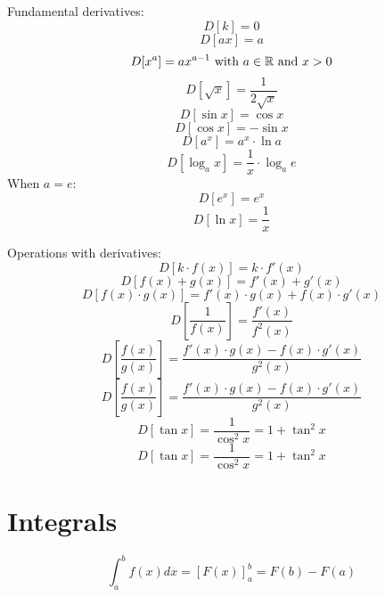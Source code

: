 \documentclass{article}
\begin{document}
Fundamental derivatives:
\begin{equation}
D [k] = 0
\end{equation}
\begin{equation}
D [ax] = a
\end{equation}
\begin{equation}
D [x^a] = ax^{a-1} \textnormal{ with } a \in \mathbb{R} \textnormal{ and } x > 0
\end{equation}
\begin{equation}
D [\sqrt{x}] = \frac{1}{2\sqrt{x}}
\end{equation}
\begin{equation}
D [\sin{x}] = \cos{x}
\end{equation}
\begin{equation}
D [\cos{x}] = -\sin{x}
\end{equation}
\begin{equation}
D [a^x] = a^x\cdot\ln{a}
\end{equation}
\begin{equation}
D [\log_a{x}] = \frac{1}{x}\cdot\log_a{e}
\end{equation}
When $a = e$:
\begin{equation}
D [e^x] = e^x
\end{equation}
\begin{equation}
D [\ln{x}] = \frac{1}{x}
\end{equation}

Operations with derivatives:
\begin{equation}
D [k\cdot f(x)] = k\cdot f'(x)
\end{equation}
\begin{equation}
D [f(x) + g(x)] = f'(x) + g'(x)
\end{equation}
\begin{equation}
D [f(x)\cdot g(x)] = f'(x) \cdot g(x) + f(x) \cdot g'(x)
\end{equation}
\begin{equation}
D [\frac{1}{f(x)}] = \frac{f'(x)}{f^2(x)}
\end{equation}
\begin{equation}
D [\frac{f(x)}{g(x)}] = \frac{f'(x) \cdot g(x) - f(x) \cdot g'(x)}{g^2(x)}
\end{equation}
\begin{equation}
D [\frac{f(x)}{g(x)}] = \frac{f'(x) \cdot g(x) - f(x) \cdot g'(x)}{g^2(x)}
\end{equation}
\begin{equation}
D [\tan{x}] = \frac{1}{\cos^2{x}} = 1 + \tan^2{x}
\end{equation}
\begin{equation}
D [\tan{x}] = \frac{1}{\cos^2{x}} = 1 + \tan^2{x}
\end{equation}

\section{Integrals}

\begin{equation}
\int_{a}^{b} f(x) dx = [F(x)]_{a}^{b} = F(b) - F(a)
\end{equation}
\end{document}
